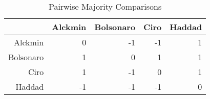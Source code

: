 \begin{table}[ht]
\centering
\begin{tabular}{rrrrr}
  \hline
 & Alckmin & Bolsonaro & Ciro & Haddad \\ 
  \hline
Alckmin & 0 & -1 & -1 & 1 \\ 
  Bolsonaro & 1 & 0 & 1 & 1 \\ 
  Ciro & 1 & -1 & 0 & 1 \\ 
  Haddad & -1 & -1 & -1 & 0 \\ 
   \hline
\end{tabular}
\caption{Pairwise Majority Comparisons} 
\label{tbl:subtab1}
\end{table}
